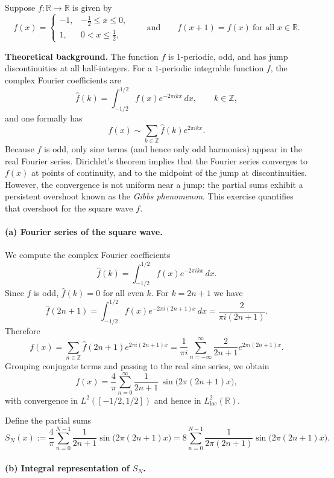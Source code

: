 \documentclass[12pt,a4paper]{article}
\theoremstyle{plain}
\theoremstyle{definition}
\theoremstyle{remark}
\theoremstyle{remark}
\begin{document}
Suppose $f:\mathbb{R}\to\mathbb{R}$ is given by
\[
f(x) =
\begin{cases}
	-1, & -\tfrac12 \le x \le 0,\\[0.3em]
	1, & 0 < x \le \tfrac12,
\end{cases}
\qquad\text{and}\qquad
f(x+1) = f(x)\ \text{for all }x\in\mathbb{R}.
\]

\bigskip
\noindent\textbf{Theoretical background.}
The function $f$ is $1$-periodic, odd, and has jump discontinuities at
all half-integers.  For a $1$-periodic integrable function $f$, the
complex Fourier coefficients are
\[
\widehat f(k) = \int_{-1/2}^{1/2} f(x)e^{-2\pi i k x}\,dx,
\qquad k\in\mathbb{Z},
\]
and one formally has
\[
f(x) \sim \sum_{k\in\mathbb{Z}} \widehat f(k)e^{2\pi i k x}.
\]
Because $f$ is odd, only sine terms (and hence only odd harmonics)
appear in the real Fourier series.  Dirichlet's theorem implies that
the Fourier series converges to $f(x)$ at points of continuity, and to
the midpoint of the jump at discontinuities.  However, the convergence
is not uniform near a jump: the partial sums exhibit a persistent
overshoot known as the \emph{Gibbs phenomenon}.  This exercise
quantifies that overshoot for the square wave $f$.

\bigskip
\paragraph{(a) Fourier series of the square wave.}

We compute the complex Fourier coefficients
\[
\widehat f(k) = \int_{-1/2}^{1/2} f(x)e^{-2\pi i k x}\,dx.
\]
Since $f$ is odd, $\widehat f(k)=0$ for all even $k$.  For $k=2n+1$ we
have
\[
\widehat f(2n+1)
= \int_{-1/2}^{1/2} f(x)e^{-2\pi i (2n+1)x}\,dx
= \frac{2}{\pi i(2n+1)}.
\]
Therefore
\[
f(x)
= \sum_{n\in\mathbb{Z}} \widehat f(2n+1)e^{2\pi i(2n+1)x}
= \frac{1}{\pi i}\sum_{n=-\infty}^{\infty}
\frac{2}{2n+1}e^{2\pi i(2n+1)x}.
\]
Grouping conjugate terms and passing to the real sine series, we obtain
\[
f(x)
= \frac{4}{\pi}\sum_{n=0}^{\infty}
\frac{1}{2n+1}\,\sin\bigl(2\pi(2n+1)x\bigr),
\]
with convergence in $L^2([-1/2,1/2])$ and hence in
$L^2_{\mathrm{loc}}(\mathbb{R})$.

Define the partial sums
\[
S_N(x)
:= \frac{4}{\pi}\sum_{n=0}^{N-1}\frac{1}{2n+1}
\sin\bigl(2\pi(2n+1)x\bigr)
= 8\sum_{n=0}^{N-1} \frac{1}{2\pi(2n+1)}
\sin\bigl(2\pi(2n+1)x\bigr).
\]

\bigskip
\paragraph{(b) Integral representation of $S_N$.}
\end{document}
